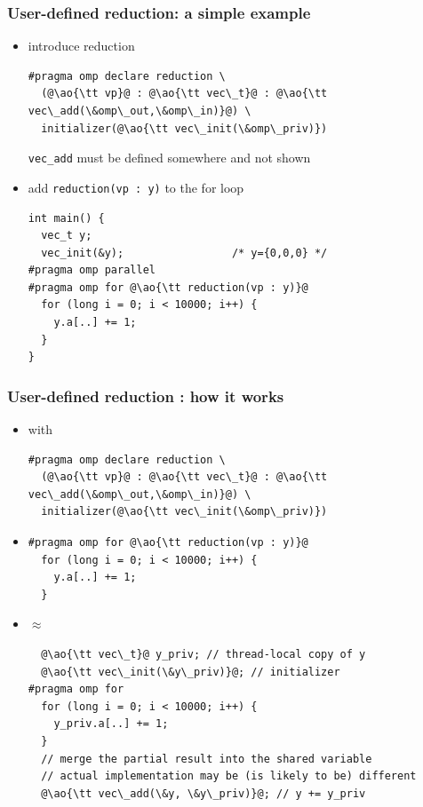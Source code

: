 \documentclass[12pt,dvipdfmx]{beamer}
\newcommand{\ao}[1]{{\color{blue}#1}}
\begin{document}
\begin{frame}[fragile]
\frametitle{User-defined reduction: a simple example}
\begin{itemize}
\item introduce reduction
\begin{lstlisting}
#pragma omp declare reduction \
  (@\ao{\tt vp}@ : @\ao{\tt vec\_t}@ : @\ao{\tt vec\_add(\&omp\_out,\&omp\_in)}@) \
  initializer(@\ao{\tt vec\_init(\&omp\_priv)})
\end{lstlisting}

{\tt vec\_add} must be defined somewhere and not shown

\item add {\tt reduction(vp : y)} to the for loop
\begin{lstlisting}
int main() {
  vec_t y;
  vec_init(&y);                 /* y={0,0,0} */
#pragma omp parallel
#pragma omp for @\ao{\tt reduction(vp : y)}@
  for (long i = 0; i < 10000; i++) {
    y.a[..] += 1;
  }
}
\end{lstlisting}
\end{itemize}
\end{frame}

\begin{frame}[fragile]
  \frametitle{User-defined reduction : how it works}
  \begin{itemize}
  \item [] with
\begin{lstlisting}
#pragma omp declare reduction \
  (@\ao{\tt vp}@ : @\ao{\tt vec\_t}@ : @\ao{\tt vec\_add(\&omp\_out,\&omp\_in)}@) \
  initializer(@\ao{\tt vec\_init(\&omp\_priv)})
\end{lstlisting}
    
  \item []
\begin{lstlisting}
#pragma omp for @\ao{\tt reduction(vp : y)}@
  for (long i = 0; i < 10000; i++) {
    y.a[..] += 1;
  }
\end{lstlisting}
\item []$\approx$
\begin{lstlisting}
  @\ao{\tt vec\_t}@ y_priv; // thread-local copy of y
  @\ao{\tt vec\_init(\&y\_priv)}@; // initializer
#pragma omp for
  for (long i = 0; i < 10000; i++) {
    y_priv.a[..] += 1;
  }
  // merge the partial result into the shared variable
  // actual implementation may be (is likely to be) different
  @\ao{\tt vec\_add(\&y, \&y\_priv)}@; // y += y_priv
\end{lstlisting}
\end{itemize}
\end{frame}
\end{document}
